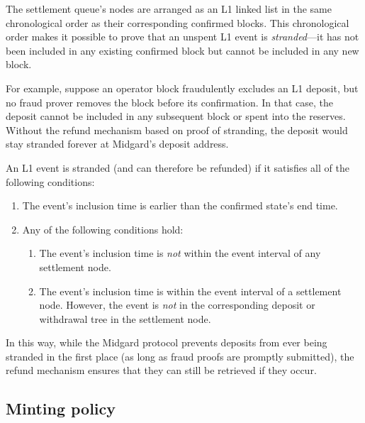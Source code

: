 \documentclass[../midgard.tex]{subfiles}
\begin{document}
The settlement queue's nodes are arranged as an L1 linked list in the same chronological order as their corresponding confirmed blocks.
This chronological order makes it possible to prove that an unspent L1 event is \emph{stranded}---it has not been included in any existing confirmed block but cannot be included in any new block.

For example, suppose an operator block fraudulently excludes an L1 deposit, but no fraud prover removes the block before its confirmation.
In that case, the deposit cannot be included in any subsequent block or spent into the reserves.
Without the refund mechanism based on proof of stranding, the deposit would stay stranded forever at Midgard's deposit address.

An L1 event is stranded (and can therefore be refunded) if it satisfies all of the following conditions:
\begin{enumerate}
  \item The event's inclusion time is earlier than the confirmed state's end time.
  \item Any of the following conditions hold:
    \begin{enumerate}
      \item The event's inclusion time is \emph{not} within the event interval of any settlement node.
      \item The event's inclusion time is within the event interval of a settlement node.
        However, the event is \emph{not} in the corresponding deposit or withdrawal tree in the settlement node.
    \end{enumerate}
\end{enumerate}

In this way, while the Midgard protocol prevents deposits from ever being stranded in the first place (as long as fraud proofs are promptly submitted), the refund mechanism ensures that they can still be retrieved if they occur.

\subsection{Minting policy}
\label{h:settlement-queue-minting-policy}
\end{document}
